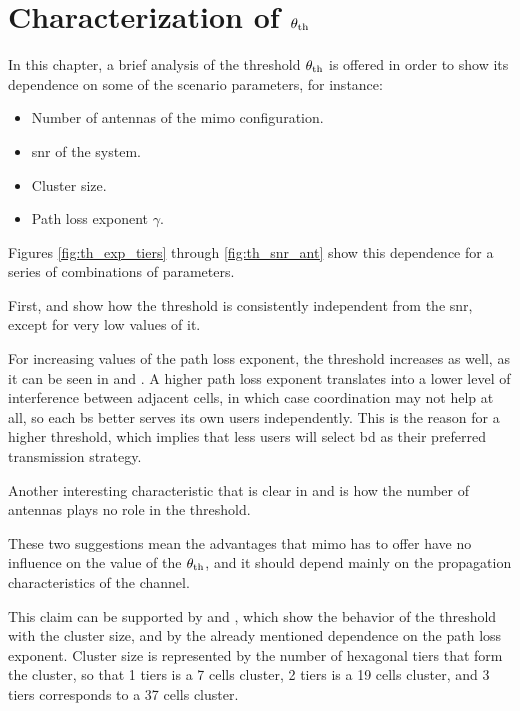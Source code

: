 \chapter{Characterization of $\theta_{\text{th}}$}
\label{ch:appendix_b}

In this chapter, a brief analysis of the threshold $\theta_{\text{th}}$ is
offered in order to show its dependence on some of the scenario parameters, for
instance:

\begin{itemize}
    \item Number of antennas of the \gls{mimo} configuration.
    \item \gls{snr} of the system.
    \item Cluster size.
    \item Path loss exponent $\gamma$.
\end{itemize}

Figures \ref{fig:th_exp_tiers} through \ref{fig:th_snr_ant} show this dependence
for a series of combinations of parameters.

First,  and  show how the threshold
is consistently independent from the \gls{snr}, except for very low values of
it.

For increasing values of the path loss exponent, the threshold increases as
well, as it can be seen in  and . A
higher path loss exponent translates into a lower level of interference between
adjacent cells, in which case coordination may not help at all, so each \gls{bs}
better serves its own users independently. This is the reason for a higher
threshold, which implies that less users will select \gls{bd} as their preferred
transmission strategy.

Another interesting characteristic that is clear in  and
 is how the number of antennas plays no role in the
threshold.

These two suggestions mean the advantages that \gls{mimo} has to offer have
no influence on the value of the $\theta_{\text{th}}$, and it should depend mainly on the
propagation characteristics of the channel.

This claim can be supported by  and
, which show the behavior of the threshold with the
cluster size, and by the already mentioned dependence on the path loss exponent.
Cluster size is represented by the number of hexagonal tiers that form the
cluster, so that 1 tiers is a 7 cells cluster, 2 tiers is a 19 cells cluster,
and 3 tiers corresponds to a 37 cells cluster.

